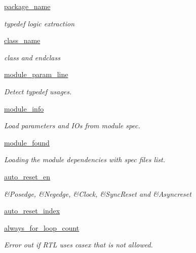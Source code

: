 \begin{DoxyCompactItemize}
\hyperlink{classsrc_1_1verilog__parser_1_1verilog__parser_ab2bdbf68ed106816c50e5845c26bbe67}{package\-\_\-name}
\begin{DoxyCompactList}\small\item\em typedef logic extraction \end{DoxyCompactList}\item 
\hyperlink{classsrc_1_1verilog__parser_1_1verilog__parser_a54670377536cff31d6b6638278eeb5d5}{class\-\_\-name}
\begin{DoxyCompactList}\small\item\em class and endclass \end{DoxyCompactList}\item 
\hyperlink{classsrc_1_1verilog__parser_1_1verilog__parser_a833a3acd432dbf02d6c9f4333bcafba2}{module\-\_\-param\-\_\-line}
\begin{DoxyCompactList}\small\item\em Detect typedef usages. \end{DoxyCompactList}\item 
\hyperlink{classsrc_1_1verilog__parser_1_1verilog__parser_a9e6de26b5fd6ad1ab65b4ed97cd6c078}{module\-\_\-info}
\begin{DoxyCompactList}\small\item\em Load parameters and I\-Os from module spec. \end{DoxyCompactList}\item 
\hyperlink{classsrc_1_1verilog__parser_1_1verilog__parser_afbe4a23f0db34f027628a4f5a9b5f7d2}{module\-\_\-found}
\begin{DoxyCompactList}\small\item\em Loading the module dependencies with spec files list. \end{DoxyCompactList}\item 
\hyperlink{classsrc_1_1verilog__parser_1_1verilog__parser_ac292954891b0eda38bc1272e74b71bf5}{auto\-\_\-reset\-\_\-en}
\begin{DoxyCompactList}\small\item\em \&Posedge, \&Negedge, \&Clock, \&Sync\-Reset and \&Asyncreset \end{DoxyCompactList}\item 
\hyperlink{classsrc_1_1verilog__parser_1_1verilog__parser_af94b1eb70c83858b118ac5f6fd150abb}{auto\-\_\-reset\-\_\-index}
\item 
\hyperlink{classsrc_1_1verilog__parser_1_1verilog__parser_a7d3f4749a1f69f8a1cf2c00b4d96f82e}{always\-\_\-for\-\_\-loop\-\_\-count}
\begin{DoxyCompactList}\small\item\em Error out if R\-T\-L uses casex that is not allowed. \end{DoxyCompactList}\item 

\end{DoxyCompactItemize}
